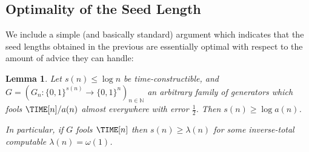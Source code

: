 \documentclass[11pt]{article}
\newtheorem{theorem}{Theorem}
\newtheorem{lemma}{Lemma}
\newcommand{\B}{\{0,1\}}
\renewcommand{\poly}{\mathrm{poly}}
\begin{document}
\subsection{Optimality of the Seed Length}

We include a simple (and basically standard) argument which indicates that the seed lengths obtained in the previous are essentially optimal with respect to the amount of advice they can handle:
\begin{lemma}\label{lem:optimal}
Let $s(n)\leq \log n$ be time-constructible, and $G = (G_n: \B^{s(n)} \to \B^n)_{n \in \mathbb{N}}$ an arbitrary family of generators which fools $\TIME[n]/a(n)$ almost everywhere with error $\frac{1}{2}$. Then $s(n) \geq \log a(n) $.

In particular, if $G$ fools $\TIME[n]$ then $s(n) \geq \lambda(n)$ for some inverse-total computable $\lambda(n) = \omega(1)$.  
\end{lemma}
\end{document}
